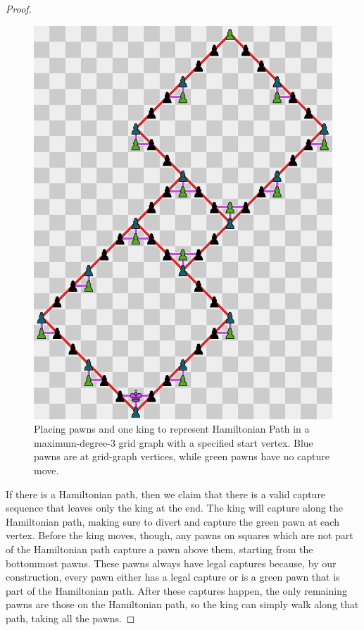 \documentclass[11pt,letterpaper]{article}
\theoremstyle{plain}
\theoremstyle{definition}
\theoremstyle{remark}
\numberwithin{equation}{section}
\begin{document}
\begin{proof}
\begin{figure}
	\centering
	\includegraphics[scale=0.5]{1KingPawnGraph}
  \caption{Placing pawns and one king to represent Hamiltonian Path in a maximum-degree-$3$ grid graph with a specified start vertex. Blue pawns are at grid-graph vertices, while green pawns have no capture move.}
	\label{fig:1KingPawn}
\end{figure}

If there is a Hamiltonian path, then we claim that
there is a valid capture sequence that leaves only the king at the end.
The king will capture along the Hamiltonian path,
making sure to divert and capture the green pawn at each vertex.
Before the king moves, though,
any pawns on squares which are not part of the Hamiltonian path
capture a pawn above them, starting from the bottommost pawns.
These pawns always have legal captures because, by our construction,
every pawn either has a legal capture or is a green pawn
that is part of the Hamiltonian path.
After these captures happen,
the only remaining pawns are those on the Hamiltonian path,
so the king can simply walk along that path, taking all the pawns.


\end{proof}
\end{document}
